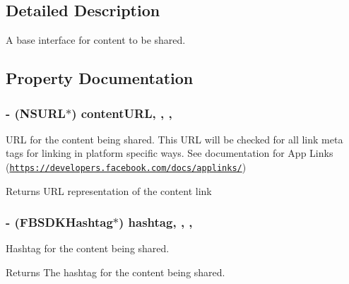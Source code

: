 \subsection{Detailed Description}
A base interface for content to be shared. 

\subsection{Property Documentation}
\hypertarget{protocol_f_b_s_d_k_sharing_content-p_af1a334ad35323e1f865fd46b6c30f0c8}{}
\subsubsection[{content\+U\+R\+L}]{\setlength{\rightskip}{0pt plus 5cm}-\/ (N\+S\+U\+R\+L$\ast$) content\+U\+R\+L\hspace{0.3cm}{\ttfamily [read]}, {\ttfamily [write]}, {\ttfamily [nonatomic]}, {\ttfamily [copy]}}\label{protocol_f_b_s_d_k_sharing_content-p_af1a334ad35323e1f865fd46b6c30f0c8}
U\+R\+L for the content being shared.  This U\+R\+L will be checked for all link meta tags for linking in platform specific ways. See documentation for App Links (\href{https://developers.facebook.com/docs/applinks/}{\tt https\+://developers.\+facebook.\+com/docs/applinks/}) \begin{DoxyReturn}{Returns}
U\+R\+L representation of the content link 
\end{DoxyReturn}
\hypertarget{protocol_f_b_s_d_k_sharing_content-p_ac94d818680e7a36895593c377d4fb6a1}{}
\subsubsection[{hashtag}]{\setlength{\rightskip}{0pt plus 5cm}-\/ ({\bf F\+B\+S\+D\+K\+Hashtag}$\ast$) hashtag\hspace{0.3cm}{\ttfamily [read]}, {\ttfamily [write]}, {\ttfamily [nonatomic]}, {\ttfamily [copy]}}\label{protocol_f_b_s_d_k_sharing_content-p_ac94d818680e7a36895593c377d4fb6a1}
Hashtag for the content being shared. \begin{DoxyReturn}{Returns}
The hashtag for the content being shared. 
\end{DoxyReturn}
\hypertarget{protocol_f_b_s_d_k_sharing_content-p_a07031f755deb87e88a8c0765c9d6651d}{}

